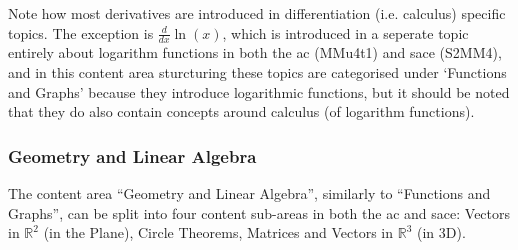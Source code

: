 \documentclass[twoside,12pt,a4paper]{report}
\begin{document}
Note how most derivatives are introduced in differentiation (i.e. calculus) specific topics. The exception is $\frac{d}{dx}\ln(x)$, which is introduced in a seperate topic entirely about logarithm functions in both the \gls{ac} (MMu4t1) and \gls{sace} (S2MM4), and in this content area sturcturing these topics are categorised under `Functions and Graphs' because they introduce logarithmic functions, but it should be noted that they do also contain concepts around calculus (of logarithm functions).

\subsubsection{Geometry and Linear Algebra}

The content area ``Geometry and Linear Algebra'', similarly to ``Functions and Graphs'', can be split into four content sub-areas in both the \gls{ac} and \gls{sace}: Vectors in $\mathbb{R}^2$ (in the Plane), Circle Theorems, Matrices and Vectors in $\mathbb{R}^3$ (in 3D).
\end{document}

